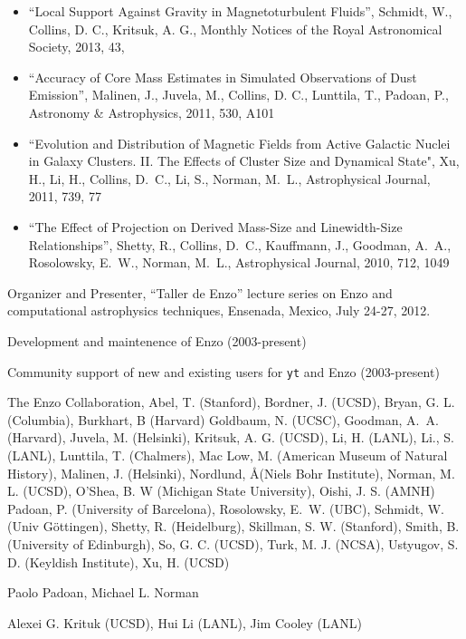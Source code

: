 \documentclass[11pt]{article}
\begin{document}
\begin{itemize}

\item
``Local Support Against Gravity in Magnetoturbulent Fluids'',
Schmidt, W., Collins, D. C., Kritsuk, A. G.,
Monthly Notices of the Royal Astronomical Society, 2013, 43, 

\item
``Accuracy of Core Mass Estimates in Simulated Observations of Dust Emission'', 
Malinen, J., Juvela, M., Collins, D. C., Lunttila, T., Padoan, P.,
Astronomy \& Astrophysics, 2011, 530, A101

\item
``Evolution and Distribution of Magnetic Fields from Active Galactic Nuclei in
Galaxy Clusters. II. The Effects of Cluster Size and Dynamical State",
Xu, H., Li, H., Collins, D.~C., Li, S., Norman, M.~L.,
Astrophysical Journal, 2011, 739, 77

\item
``The Effect of Projection on Derived Mass-Size and Linewidth-Size Relationships'', 
Shetty, R., Collins, D.~C.,  Kauffmann, J.,  Goodman, A.~A.,  Rosolowsky, E.~W.,  Norman, M.~L., 
Astrophysical Journal, 2010, 712, 1049
\end{itemize}


\medskip
\noindent Organizer and Presenter, ``Taller de Enzo'' lecture series on Enzo and
computational astrophysics techniques, Ensenada, Mexico, July 24-27, 2012.

\medskip
\noindent Development and maintenence of Enzo (2003-present)

\medskip 
\noindent Community support of new and existing users for {\tt yt} and Enzo
(2003-present)

\medskip


\noindent The Enzo Collaboration,  Abel, T. (Stanford),   Bordner, J.
(UCSD),   Bryan, G. L. (Columbia), 
Burkhart, B (Harvard)
Goldbaum, N. (UCSC),   Goodman, A.~A.
(Harvard),    Juvela, M. (Helsinki),     Kritsuk, A. G. (UCSD),   Li, H. (LANL),
   Li., S. (LANL), Lunttila, T. (Chalmers),
   Mac Low, M. (American Museum of Natural History), 
Malinen, J. (Helsinki), Nordlund, \AA (Niels Bohr
Institute),   Norman, M. L. (UCSD),    O'Shea, B. W (Michigan State University),
Oishi, J. S. (AMNH)   Padoan, P. (University of Barcelona),   
Rosolowsky, E.~W. (UBC),   Schmidt, W. (Univ
G\"ottingen),   Shetty, R. (Heidelburg), 
Skillman,
S. W. (Stanford),    Smith, B. (University of Edinburgh),
So, G. C. (UCSD),   
   Turk, M. J. (NCSA), Ustyugov, S. D. (Keyldish Institute),
Xu, H. (UCSD)


\medskip
{} Paolo Padoan, Michael L. Norman

\medskip
{} Alexei G. Krituk (UCSD), Hui
Li (LANL), Jim Cooley (LANL)


%

%
\end{document}
